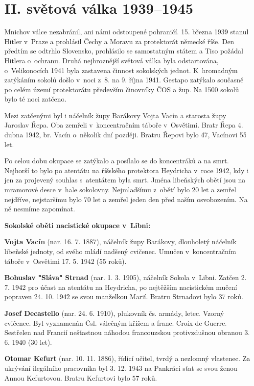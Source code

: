 \documentclass[a5paper, 11pt, twoside]{article}
\begin{document}
\section{II. světová válka
1939--1945}

Mnichov válce nezabránil, ani námi odstoupené pohraničí. 15. března 1939
stanul Hitler v~Praze a prohlásil Čechy a Moravu za protektorát německé
říše. Den předtím se odtrhlo Slovensko, prohlásilo se samostatným státem
a Tiso požádal Hitlera o~ochranu. Druhá nejhroznější světová válka byla
odstartována, o~Velikonocích 1941 byla zastavena činnost sokolských
jednot. K~hromadným zatýkáním sokolů došlo v~noci z~8. na 9. října 1941.
Gestapo zatýkalo současně po celém území protektorátu především
činovníky ČOS a žup. Na 1500 sokolů bylo té noci zatčeno.

Mezi zatčenými byl i náčelník župy Barákovy Vojta Vacín a starosta župy
Jaroslav Řepa. Oba zemřeli v~koncentračním táboře v~Osvětimi. Bratr Řepa
4. dubna 1942, br. Vacín o~několik dní později. Bratru Řepovi bylo 47,
Vacínovi 55 let.

Po celou dobu okupace se zatýkalo a posílalo se do koncentráků a na
smrt. Nejhorší to bylo po atentátu na říšského protektora Heydricha
v~roce 1942, kdy i jen za projevený souhlas s~atentátem byla smrt. Jména
libeňských obětí jsou na mramorové desce v~hale sokolovny. Nejmladšímu
z~obětí bylo 20 let a zemřel nejdříve, nejstaršímu bylo 70 let a zemřel
jeden den před naším osvobozením. Na ně nesmíme zapomínat.

\textbf{Sokolské oběti nacistické okupace v~Libni:}

\textbf{Vojta Vacín} (nar. 16. 7. 1887), náčelník župy Barákovy,
dlouholetý náčelník libeňské jednoty, od svého mládí nadšený cvičenec.
Umučen v~koncentračním táboře v~Osvětimi 17. 5. 1942 (55 roků).

\textbf{Bohuslav "Sláva" Strnad} (nar. 1. 3. 1905), náčelník Sokola
v~Libni. Zatčen 2. 7. 1942 pro účast na atentátu na Heydricha, po
nejtěžším nacistickém mučení popraven 24. 10. 1942 se svou manželkou
Marií. Bratru Strnadovi bylo 37 roků.

\textbf{Josef Decastello} (nar. 24. 6. 1910), plukovník čs. armády,
letec. Vzorný cvičenec. Byl vyznamenán Čsl. válečným křížem a franc.
Croix de Guerre. Sestřelen nad Francií nešťastnou náhodou
francouzskou protivzdušnou obranou 3. 6. 1940 (30 let).

\textbf{Otomar Kefurt} (nar. 10. 11. 1886), řídící učitel, tvrdý a
nezlomný vlastenec. Za ukrývání ilegálního pracovníka byl 3. 12. 1943 na
Pankráci sťat se svou ženou Annou Kefurtovou. Bratru Kefurtovi bylo 57
roků.
\end{document}
